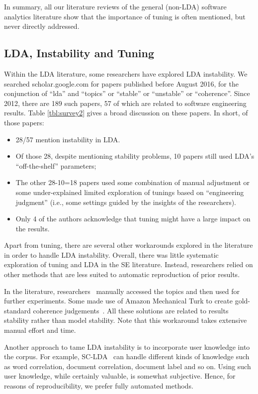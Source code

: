 \documentclass[twocolumn,5p,sort&compress]{elsarticle}
\newcommand{\bi}{\begin{itemize}}
\newcommand{\ei}{\end{itemize}}
\theoremstyle{break}
\begin{document}
In summary, all our literature reviews of the general  (non-LDA) software analytics literature
show that
the importance of tuning is often mentioned, but never directly addressed.

\subsection{LDA,  Instability and Tuning}
\label{sect:solutions}
Within the LDA literature, some researchers
have explored LDA instability.
We searched scholar.google.com for papers published before August 2016, for the conjunction of ``lda'' and ``topics'' or ``stable'' or
``unstable'' or ``coherence''. Since 2012, there are  189 such papers, 57
of which are related to software engineering results. Table \ref{tbl:survey2} gives a broad discussion on these papers. In short, of those papers:
\bi
\item 28/57
mention instability in LDA. %
\item Of those 28, despite mentioning stability problems,
  10 papers still used LDA's ``off-the-shelf'' parameters;
  \item The  other 28-10=18 papers used some combination of manual adjustment or some
under-explained limited exploration of tunings based on ``engineering judgment''
(i.e., some settings guided by the insights of the researchers).
\item
Only 4 of the authors acknowledge that tuning might have a large impact
on the results.
\ei
Apart from tuning, there are several other workarounds explored in the literature
in order to handle LDA instability. Overall, there was little systematic exploration of tuning and LDA in the SE literature.
Instead, researchers relied on other methods that are less suited to automatic reproduction of prior results.

In the literature, researchers~\cite{maskeri2008mining, martin2015app, guzman2014users}
    manually accessed the topics and then used for further experiments. Some
    made use of Amazon Mechanical Turk to create gold-standard coherence
    judgements~\cite{lau2014machine}. All these solutions are related to results
    stability rather than model stability.
    Note that this workaround takes extensive manual effort and time.

    
    Another approach to tame LDA instability
    is to incorporate
    user knowledge into the corpus. For example,
    SC-LDA~\cite{yang2015improving} can
    handle different kinds of knowledge such as word correlation,
    document correlation, document label and so on. Using such user
    knowledge, while certainly valuable, is somewhat subjective.
    Hence, for reasons of reproducibility, we prefer fully
    automated methods.
\end{document}
